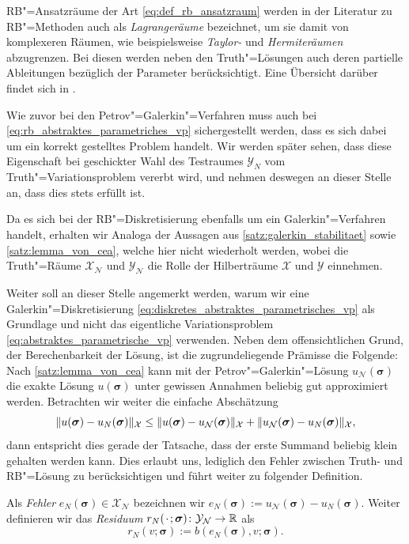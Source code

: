 \documentclass[../main.tex]{subfiles}
\begin{document}
RB"=Ansatzräume der Art \cref{eq:def_rb_ansatzraum} werden in der Literatur zu RB"=Methoden auch als \emph{Lagrangeräume} bezeichnet, um sie damit von komplexeren Räumen, wie beispielsweise \emph{Taylor-} und \emph{Hermiteräumen} abzugrenzen.
Bei diesen werden neben den Truth"=Lösungen auch deren partielle Ableitungen bezüglich der Parameter berücksichtigt.
Eine Übersicht darüber findet sich in \cite[Chapter 3]{Patera:2007un}.

Wie zuvor bei den Petrov"=Galerkin"=Verfahren muss auch bei \cref{eq:rb_abstraktes_parametriches_vp} sichergestellt werden, dass es sich dabei um ein korrekt gestelltes Problem handelt.
Wir werden später sehen, dass diese Eigenschaft bei geschickter Wahl des Testraumes $\mathcal Y_{N}$ vom Truth"=Variationsproblem vererbt wird, und nehmen deswegen an dieser Stelle an, dass dies stets erfüllt ist.

Da es sich bei der RB"=Diskretisierung ebenfalls um ein Galerkin"=Verfahren handelt, erhalten wir Analoga der Aussagen aus \cref{satz:galerkin_stabilitaet} sowie \cref{satz:lemma_von_cea}, welche hier nicht wiederholt werden, wobei die Truth"=Räume $\mathcal X_{\mathcal N}$ und $\mathcal Y_{\mathcal N}$ die Rolle der Hilberträume $\mathcal X$ und $\mathcal Y$ einnehmen.

Weiter soll an dieser Stelle angemerkt werden, warum wir eine Galerkin"=Diskretisierung \cref{eq:diskretes_abstraktes_parametrisches_vp} als Grundlage und nicht das eigentliche Variationsproblem \cref{eq:abstraktes_parametrische_vp} verwenden.
Neben dem offensichtlichen Grund, der Berechenbarkeit der Lösung, ist die zugrundeliegende Prämisse die Folgende:
Nach \cref{satz:lemma_von_cea} kann mit der Petrov"=Galerkin"=Lösung $u_{\mathcal N}(\bm \sigma)$ die exakte Lösung $u(\bm \sigma)$ unter gewissen Annahmen beliebig gut approximiert werden.
Betrachten wir weiter die einfache Abschätzung
\begin{equation}
    \lVert u(\bm \sigma) - u_{N}(\bm \sigma)\rVert_{\mathcal X} \leq \lVert u(\bm \sigma) - u_{\mathcal N}(\bm \sigma)\rVert_{\mathcal X} + \lVert u_{\mathcal N}(\bm \sigma) - u_{N}(\bm \sigma)\rVert_{\mathcal X},
\end{equation}
dann entspricht dies gerade der Tatsache, dass der erste Summand beliebig klein gehalten werden kann.
Dies erlaubt uns, lediglich den Fehler zwischen Truth- und RB"=Lösung zu berücksichtigen und führt weiter zu folgender Definition.

\begin{Definition}\label{definition:rbm_fehler_und_residuum}
    Als \emph{Fehler} $e_{N}(\bm \sigma) \in \mathcal X_{\mathcal N}$ bezeichnen wir $e_{N}(\bm \sigma) := u_{\mathcal N}(\bm \sigma) - u_{N}(\bm \sigma)$.
    Weiter definieren wir das \emph{Residuum} $r_{N}({\mkern2mu\cdot\mkern2mu}; \bm \sigma) \colon \mathcal Y_{\mathcal N} \to \mathbb{R}$ als
    \begin{equation}\label{eq:variationsproblem_residuum}
        r_{N}(v; \bm \sigma) := b(e_{N}(\bm \sigma), v; \bm \sigma).
    \end{equation}
\end{Definition}
\end{document}
